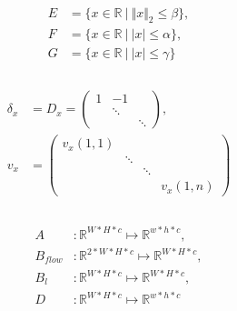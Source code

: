 \documentclass[A4,12pt]{article}
\DeclareMathOperator*{\argmin}{arg\,min}
\newcommand{\R}{\mathbb{R}}
\newcommand{\norm}[1]{\Vert #1 \Vert}
\begin{document}
\\
\begin{equation}
\begin{aligned}
E &= \{x \in \R ~|~ \norm{x}_2 \leq \beta \}, \\
F &= \{x \in \R ~|~ |x| \leq \alpha \}, \\
G &= \{x \in \R ~|~ |x| \leq \gamma \} \\
\end{aligned}
\end{equation}
\\
\begin{equation}
\begin{aligned}
\delta_x&=D_x=\begin{pmatrix}1 & -1 & \\ & \ddots & \\ & & \ddots \end{pmatrix}, \\
v_x&=\begin{pmatrix}v_x(1,1)& & & \\ & \ddots & & \\ & & \ddots & \\ & & & v_x(1,n) \end{pmatrix}  \\
\end{aligned}
\end{equation}
\\
\begin{equation}
\begin{aligned}
A&\colon\R^{W*H*c}\mapsto\R^{w*h*c}, \\
B_{flow}&\colon\R^{2*W*H*c}\mapsto\R^{W*H*c}, \\
B_l&\colon\R^{W*H*c}\mapsto\R^{W*H*c}, \\
D&\colon\R^{W*H*c}\mapsto\R^{w*h*c} \\
\end{aligned}
\end{equation}



\end{document}
